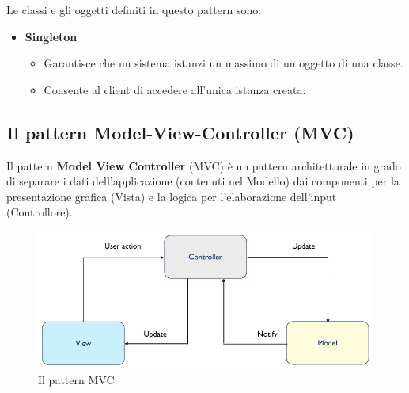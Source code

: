 \documentclass[12pt]{article}
\begin{document}
Le classi e gli oggetti definiti in questo pattern sono:
\begin{itemize}
	\item \textbf{Singleton}
	\begin{itemize}
		\item Garantisce che un sistema istanzi un massimo di un oggetto di una classe.
		\item Consente al client di accedere all'unica istanza creata.
	\end{itemize}
\end{itemize}

\subsection{Il pattern Model-View-Controller (MVC)}
Il pattern \textbf{Model View Controller} (MVC) è un pattern architetturale in grado di separare i dati dell'applicazione (contenuti nel Modello) dai componenti per la presentazione grafica (Vista) e la
logica per l'elaborazione dell'input (Controllore).

\begin{figure}[H]
	\centering
	\includegraphics[scale=0.40]{images/mvc.jpg}
	\caption{Il pattern MVC}
	\label{mvc}
\end{figure}
\end{document}
